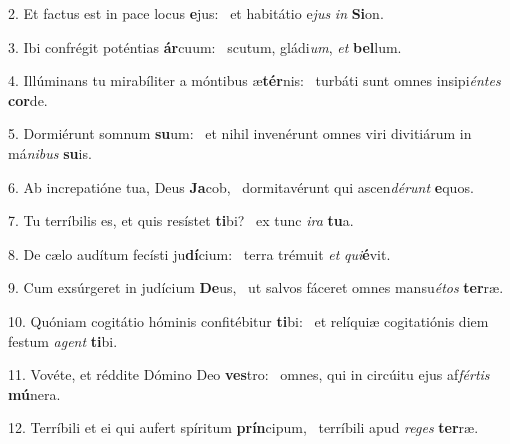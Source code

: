 2. Et factus est in pace locus \textbf{e}jus: \ast\  et habitátio e\textit{jus} \textit{in} \textbf{Si}on.\

3. Ibi confrégit poténtias \textbf{ár}cuum: \ast\  scutum, gládi\textit{um}, \textit{et} \textbf{bel}lum.\

4. Illúminans tu mirabíliter a móntibus æ\textbf{tér}nis: \ast\  turbáti sunt omnes insipi\textit{én}\textit{tes} \textbf{cor}de.\

5. Dormiérunt somnum \textbf{su}um: \ast\  et nihil invenérunt omnes viri divitiárum in má\textit{ni}\textit{bus} \textbf{su}is.\

6. Ab increpatióne tua, Deus \textbf{Ja}cob, \ast\  dormitavérunt qui ascen\textit{dé}\textit{runt} \textbf{e}quos.\

7. Tu terríbilis es, et quis resístet \textbf{ti}bi? \ast\  ex tunc \textit{i}\textit{ra} \textbf{tu}a.\

8. De cælo audítum fecísti ju\textbf{dí}cium: \ast\  terra trémuit \textit{et} \textit{qui}\textbf{é}vit.\

9. Cum exsúrgeret in judícium \textbf{De}us, \ast\  ut salvos fáceret omnes mansu\textit{é}\textit{tos} \textbf{ter}ræ.\

10. Quóniam cogitátio hóminis confitébitur \textbf{ti}bi: \ast\  et relíquiæ cogitatiónis diem festum \textit{a}\textit{gent} \textbf{ti}bi.\

11. Vovéte, et réddite Dómino Deo \textbf{ves}tro: \ast\  omnes, qui in circúitu ejus af\textit{fér}\textit{tis} \textbf{mú}nera.\

12. Terríbili et ei qui aufert spíritum \textbf{prín}cipum, \ast\  terríbili apud \textit{re}\textit{ges} \textbf{ter}ræ.\

